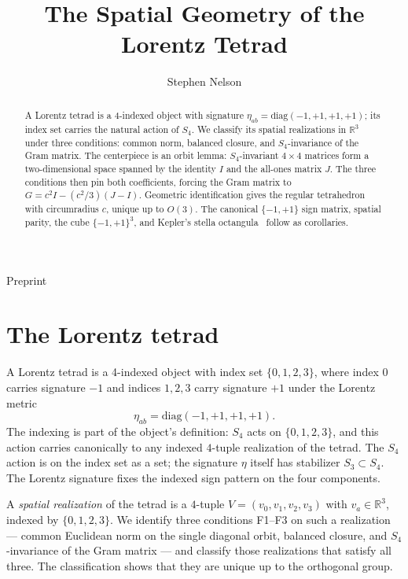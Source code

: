 \documentclass[twocolumn]{iopjournal}
\renewcommand{\articletype}[1]{%
  {\vspace*{-8mm}\noindent \Large \sf Preprint}\par
  \vspace*{6mm}\noindent{\scriptsize \sf{\bfseries \MakeUppercase{#1}}}}
\theoremstyle{definition}
\begin{document}
\articletype{Supplementary Material}

\title{The Spatial Geometry of the Lorentz Tetrad}

\author{Stephen Nelson}



\begin{abstract}
A Lorentz tetrad is a 4-indexed object with signature
$\eta_{ab} = \mathrm{diag}(-1,+1,+1,+1)$; its index set carries the
natural action of $S_4$.  We classify its spatial realizations in
$\mathbb{R}^3$ under three conditions: common norm, balanced
closure, and $S_4$-invariance of the Gram matrix.  The centerpiece
is an orbit lemma: $S_4$-invariant $4 \times 4$ matrices form a
two-dimensional space spanned by the identity $I$ and the all-ones
matrix $J$.  The three conditions then pin both coefficients,
forcing the Gram matrix to $G = c^2 I - (c^2/3)(J - I)$.
Geometric identification gives the regular tetrahedron with
circumradius $c$, unique up to $O(3)$.  The canonical $\{-1,+1\}$
sign matrix, spatial parity, the cube $\{-1,+1\}^3$, and Kepler's
stella octangula~\cite{Kepler1619,Cromwell1997} follow as
corollaries.
\end{abstract}


\section*{The Lorentz tetrad}

A Lorentz tetrad is a 4-indexed object with index set
$\{0, 1, 2, 3\}$, where index 0 carries signature $-1$ and
indices $1, 2, 3$ carry signature $+1$ under the Lorentz metric
\begin{equation}
  \eta_{ab} = \mathrm{diag}(-1,+1,+1,+1).
  \label{eq:lorentz}
\end{equation}
The indexing is part of the object's definition: $S_4$ acts on
$\{0,1,2,3\}$, and this action carries canonically to any indexed
$4$-tuple realization of the tetrad.  The $S_4$ action is on the
index set as a set; the signature $\eta$ itself has stabilizer
$S_3 \subset S_4$.  The Lorentz signature fixes the indexed sign
pattern on the four components.

A \emph{spatial realization} of the tetrad is a $4$-tuple
$V = (v_0, v_1, v_2, v_3)$ with $v_a \in \mathbb{R}^3$, indexed by
$\{0, 1, 2, 3\}$.  We identify three conditions F1--F3 on such a
realization --- common Euclidean norm on the single diagonal
orbit, balanced closure, and $S_4$-invariance of the Gram matrix
--- and classify those realizations that satisfy all three.  The
classification shows that they are unique up to the orthogonal
group.
\end{document}
